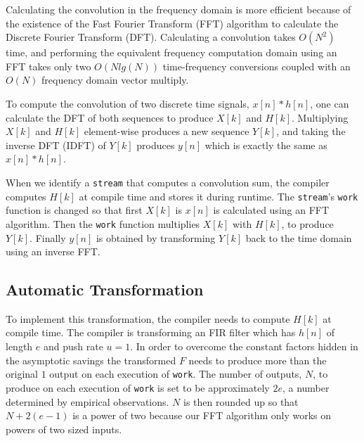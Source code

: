 Calculating the convolution in the frequency domain is more efficient
because of the existence of the Fast Fourier Transform (FFT) algorithm
to calculate the Discrete Fourier Transform (DFT). Calculating a
convolution takes $O(N^2)$ time, and performing the equivalent
frequency computation domain using an FFT takes only two $O(N lg(N))$
time-frequency conversions coupled with an $O(N)$ frequency domain
vector multiply.


To compute the convolution of two discrete time signals, $x[n]*h[n]$,
one can calculate the DFT of both sequences to produce $X[k]$ and
$H[k]$. Multiplying $X[k]$ and $H[k]$ element-wise produces a new
sequence $Y[k]$, and taking the inverse DFT (IDFT) of $Y[k]$ produces
$y[n]$ which is exactly the same as $x[n]*h[n]$.

When we identify a {\tt stream} that computes a convolution sum, the
compiler computes $H[k]$ at compile time and stores it during runtime. 
The {\tt stream}'s {\tt work} function is changed so that first $X[k]$ is 
$x[n]$ is calculated using an FFT algorithm. Then the {\tt work} function 
multiplies $X[k]$ with $H[k]$, to produce $Y[k]$. Finally $y[n]$ is obtained by
transforming $Y[k]$ back to the time domain using an inverse FFT.

\subsection{Automatic Transformation}

To implement this transformation, the compiler needs to compute $H[k]$ at
compile time. The compiler is transforming an FIR filter which has $h[n]$ of length $e$
and push rate $u=1$.
In order to overcome the constant factors hidden in the asymptotic savings
the transformed $F$ needs to produce more than the original $1$ output on each
execution of {\tt work}. The number of outputs, $N$, to produce on each 
execution of {\tt work} is set to be approximately $2e$, a number determined
by empirical observations. $N$ is then rounded up so that $N+2(e-1)$ is a power of two 
because our FFT algorithm only works on powers of two sized inputs. 

